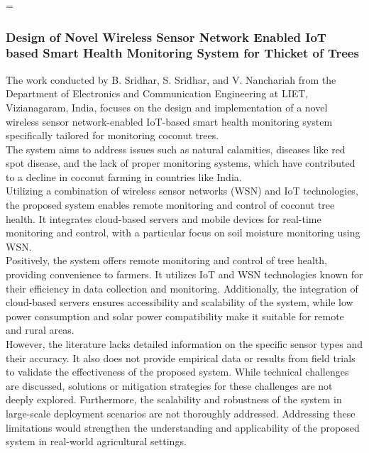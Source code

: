 =\documentclass[12pt, a4paper]{article}
\begin{document}
\subsubsection{Design of Novel Wireless Sensor Network Enabled IoT based Smart Health Monitoring System for Thicket of Trees}
The work conducted by B. Sridhar, S. Sridhar, and V. Nanchariah \cite{sridhar2020design} from the Department of Electronics and Communication Engineering at LIET, Vizianagaram, India, focuses on the design and implementation of a novel wireless sensor network-enabled IoT-based smart health monitoring system specifically tailored for monitoring coconut trees.\\
The system aims to address issues such as natural calamities, diseases like red spot disease, and the lack of proper monitoring systems, which have contributed to a decline in coconut farming in countries like India.\\
Utilizing a combination of wireless sensor networks (WSN) and IoT technologies, the proposed system enables remote monitoring and control of coconut tree health. It integrates cloud-based servers and mobile devices for real-time monitoring and control, with a particular focus on soil moisture monitoring using WSN.\\
Positively, the system offers remote monitoring and control of tree health, providing convenience to farmers. It utilizes IoT and WSN technologies known for their efficiency in data collection and monitoring. Additionally, the integration of cloud-based servers ensures accessibility and scalability of the system, while low power consumption and solar power compatibility make it suitable for remote and rural areas.\\
However, the literature lacks detailed information on the specific sensor types and their accuracy. It also does not provide empirical data or results from field trials to validate the effectiveness of the proposed system. While technical challenges are discussed, solutions or mitigation strategies for these challenges are not deeply explored. Furthermore, the scalability and robustness of the system in large-scale deployment scenarios are not thoroughly addressed. Addressing these limitations would strengthen the understanding and applicability of the proposed system in real-world agricultural settings.
\end{document}
